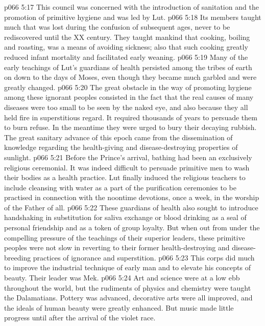 \vs p066 5:17 \bibnobreakspace {} This council was concerned with the introduction of sanitation and the promotion of primitive hygiene and was led by Lut.
\vs p066 5:18 Its members taught much that was lost during the confusion of subsequent ages, never to be rediscovered until the XX century. They taught mankind that cooking, boiling and roasting, was a means of avoiding sickness; also that such cooking greatly reduced infant mortality and facilitated early weaning.
\vs p066 5:19 Many of the early teachings of Lut’s guardians of health persisted among the tribes of earth on down to the days of Moses, even though they became much garbled and were greatly changed.
\vs p066 5:20 The great obstacle in the way of promoting hygiene among these ignorant peoples consisted in the fact that the real causes of many diseases were too small to be seen by the naked eye, and also because they all held fire in superstitious regard. It required thousands of years to persuade them to burn refuse. In the meantime they were urged to bury their decaying rubbish. The great sanitary advance of this epoch came from the dissemination of knowledge regarding the health\hyp{}giving and disease\hyp{}destroying properties of sunlight.
\vs p066 5:21 Before the Prince’s arrival, bathing had been an exclusively religious ceremonial. It was indeed difficult to persuade primitive men to wash their bodies as a health practice. Lut finally induced the religious teachers to include cleansing with water as a part of the purification ceremonies to be practised in connection with the noontime devotions, once a week, in the worship of the Father of all.
\vs p066 5:22 These guardians of health also sought to introduce handshaking in substitution for saliva exchange or blood drinking as a seal of personal friendship and as a token of group loyalty. But when out from under the compelling pressure of the teachings of their superior leaders, these primitive peoples were not slow in reverting to their former health\hyp{}destroying and disease\hyp{}breeding practices of ignorance and superstition.
\vs p066 5:23 \bibnobreakspace {} This corps did much to improve the industrial technique of early man and to elevate his concepts of beauty. Their leader was Mek.
\vs p066 5:24 Art and science were at a low ebb throughout the world, but the rudiments of physics and chemistry were taught the Dalamatians. Pottery was advanced, decorative arts were all improved, and the ideals of human beauty were greatly enhanced. But music made little progress until after the arrival of the violet race.

